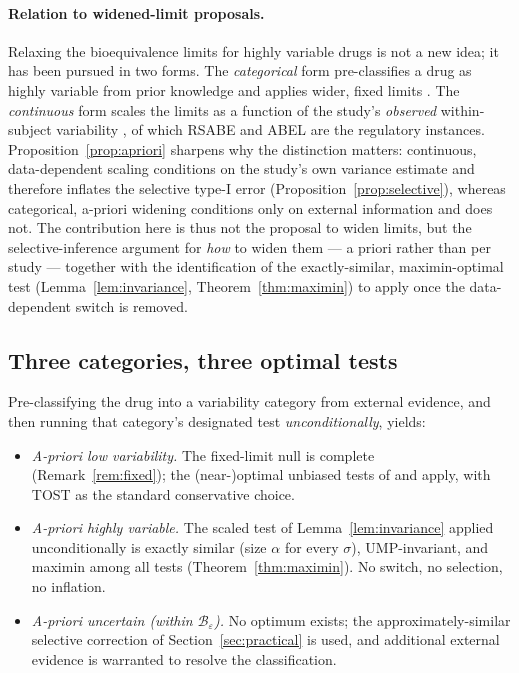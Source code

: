 \documentclass[11pt]{article}
\theoremstyle{remark}
\begin{document}
\paragraph{Relation to widened-limit proposals.} Relaxing the bioequivalence limits for highly variable drugs is not a new idea; it has been pursued in two forms. The \emph{categorical} form pre-classifies a drug as highly variable from prior knowledge and applies wider, fixed limits \citep{boddy1995}. The \emph{continuous} form scales the limits as a function of the study's \emph{observed} within-subject variability \citep{karalis2004, karalis2005}, of which RSABE and ABEL are the regulatory instances. Proposition~\ref{prop:apriori} sharpens why the distinction matters: continuous, data-dependent scaling conditions on the study's own variance estimate and therefore inflates the selective type-I error (Proposition~\ref{prop:selective}), whereas categorical, a-priori widening conditions only on external information and does not. The contribution here is thus not the proposal to widen limits, but the selective-inference argument for \emph{how} to widen them --- a priori rather than per study --- together with the identification of the exactly-similar, maximin-optimal test (Lemma~\ref{lem:invariance}, Theorem~\ref{thm:maximin}) to apply once the data-dependent switch is removed.

\subsection{Three categories, three optimal tests}
Pre-classifying the drug into a variability category from external evidence, and then running that category's designated test \emph{unconditionally}, yields:
\begin{itemize}
\item[\textbf{L}] \emph{A-priori low variability.} The fixed-limit null is complete (Remark~\ref{rem:fixed}); the (near-)optimal unbiased tests of \citet{bhm1997} and \citet{bergerhsu1996} apply, with TOST \citep{schuirmann1987} as the standard conservative choice.
\item[\textbf{H}] \emph{A-priori highly variable.} The scaled test of Lemma~\ref{lem:invariance} applied unconditionally is exactly similar (size $\alpha$ for every $\sigma$), UMP-invariant, and maximin among all tests (Theorem~\ref{thm:maximin}). No switch, no selection, no inflation.
\item[\textbf{T}] \emph{A-priori uncertain (within $\mathcal{B}_\varepsilon$).} No optimum exists; the approximately-similar selective correction of Section~\ref{sec:practical} is used, and additional external evidence is warranted to resolve the classification.
\end{itemize}
\end{document}
